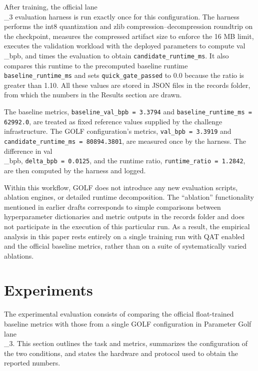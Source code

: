 \documentclass{article}
\begin{document}
After training, the official lane\\_3 evaluation harness is run exactly once for this configuration. The harness performs the int8 quantization and zlib compression--decompression roundtrip on the checkpoint, measures the compressed artifact size to enforce the 16 MB limit, executes the validation workload with the deployed parameters to compute val\\_bpb, and times the evaluation to obtain \texttt{candidate\_runtime\_ms}. It also compares this runtime to the precomputed baseline runtime \texttt{baseline\_runtime\_ms} and sets \texttt{quick\_gate\_passed} to 0.0 because the ratio is greater than 1.10. All these values are stored in JSON files in the records folder, from which the numbers in the Results section are drawn.

The baseline metrics, \texttt{baseline\_val\_bpb = 3.3794} and \texttt{baseline\_runtime\_ms = 62992.0}, are treated as fixed reference values supplied by the challenge infrastructure. The GOLF configuration's metrics, \texttt{val\_bpb = 3.3919} and \texttt{candidate\_runtime\_ms = 80894.3801}, are measured once by the harness. The difference in val\\_bpb, \texttt{delta\_bpb = 0.0125}, and the runtime ratio, \texttt{runtime\_ratio = 1.2842}, are then computed by the harness and logged.

Within this workflow, GOLF does not introduce any new evaluation scripts, ablation engines, or detailed runtime decomposition. The ``ablation'' functionality mentioned in earlier drafts corresponds to simple comparisons between hyperparameter dictionaries and metric outputs in the records folder and does not participate in the execution of this particular run. As a result, the empirical analysis in this paper rests entirely on a single training run with QAT enabled and the official baseline metrics, rather than on a suite of systematically varied ablations.

\section{Experiments}

\label{sec:experiments}

The experimental evaluation consists of comparing the official float-trained baseline metrics with those from a single GOLF configuration in Parameter Golf lane\\_3. This section outlines the task and metrics, summarizes the configuration of the two conditions, and states the hardware and protocol used to obtain the reported numbers.
\end{document}
